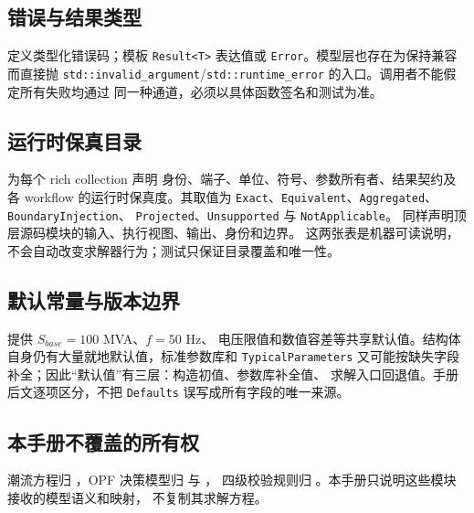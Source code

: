 \subsection{错误与结果类型}

 定义类型化错误码；模板
\texttt{Result<T>} 表达值或 \texttt{Error}。模型层也存在为保持兼容而直接抛
\texttt{std::invalid\_argument}/\texttt{std::runtime\_error} 的入口。调用者不能假定所有失败均通过
同一种通道，必须以具体函数签名和测试为准。

\subsection{运行时保真目录}

 为每个 rich collection 声明
身份、端子、单位、符号、参数所有者、结果契约及各 workflow 的运行时保真度。其取值为
\texttt{Exact}、\texttt{Equivalent}、\texttt{Aggregated}、\texttt{BoundaryInjection}、
\texttt{Projected}、\texttt{Unsupported} 与 \texttt{NotApplicable}。
 同样声明顶层源码模块的输入、执行视图、输出、身份和边界。
这两张表是机器可读说明，不会自动改变求解器行为；测试只保证目录覆盖和唯一性。

\subsection{默认常量与版本边界}

 提供 $S_{base}=100$ MVA、$f=50$ Hz、
电压限值和数值容差等共享默认值。结构体自身仍有大量就地默认值，标准参数库和
\texttt{TypicalParameters} 又可能按缺失字段补全；因此“默认值”有三层：构造初值、参数库补全值、
求解入口回退值。手册后文逐项区分，不把 \texttt{Defaults} 误写成所有字段的唯一来源。

\subsection{本手册不覆盖的所有权}

潮流方程归 ，OPF 决策模型归
 与 ，
四级校验规则归 。本手册只说明这些模块接收的模型语义和映射，
不复制其求解方程。
